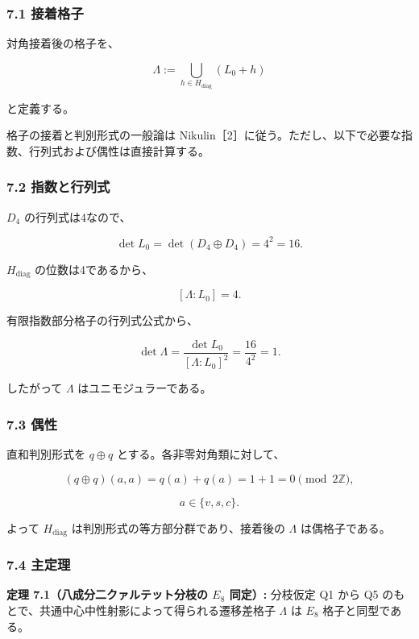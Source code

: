 \documentclass[
  a4paper,
  ja=minimal,
  xelatex,
  paragraph-mark={},
]{bxjsarticle}
\begin{document}
\subsubsection{7.1 接着格子}\label{ux63a5ux7740ux683cux5b50}

対角接着後の格子を、

\[
\Lambda
:=
\bigcup_{h\in H_{\mathrm{diag}}}
\left(
L_0+h
\right)
\]

と定義する。

格子の接着と判別形式の一般論は
Nikulin［2］に従う。ただし、以下で必要な指数、行列式および偶性は直接計算する。

\subsubsection{7.2
指数と行列式}\label{ux6307ux6570ux3068ux884cux5217ux5f0f}

\(D_4\) の行列式は4なので、

\[
\det L_0
{}=
\det(D_4\oplus D_4)
{}=
4^2
{}=16.
\]

\(H_{\mathrm{diag}}\) の位数は4であるから、

\[
[\Lambda:L_0]
{}=4.
\]

有限指数部分格子の行列式公式から、

\[
\det\Lambda
{}=
\frac{\det L_0}
{[\Lambda:L_0]^2}
{}=
\frac{16}{4^2}
{}=1.
\]

したがって \(\Lambda\) はユニモジュラーである。

\subsubsection{7.3 偶性}\label{ux5076ux6027}

直和判別形式を \(q\oplus q\) とする。各非零対角類に対して、

\[
(q\oplus q)(a,a)
{}=
q(a)+q(a)
{}=
1+1
{}=0
\pmod{2\mathbb Z},
\]

\[
a\in\{v,s,c\}.
\]

よって \(H_{\mathrm{diag}}\) は判別形式の等方部分群であり、接着後の
\(\Lambda\) は偶格子である。

\subsubsection{7.4 主定理}\label{ux4e3bux5b9aux7406}

\textbf{定理 7.1（八成分二クァルテット分枝の \(E_8\) 同定）:} 分枝仮定
Q1 から Q5 のもとで、共通中心中性射影によって得られる遷移差格子
\(\Lambda\) は \(E_8\) 格子と同型である。
\end{document}
